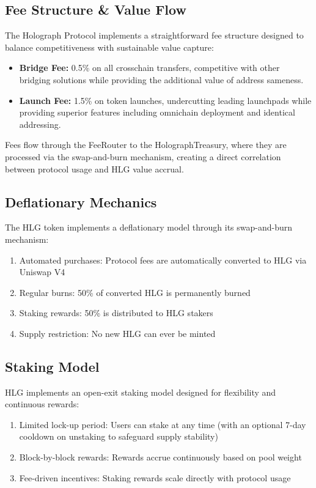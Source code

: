\documentclass[10pt,a4paper,twocolumn]{article}
\begin{document}
\subsection{Fee Structure \& Value Flow}
The Holograph Protocol implements a straightforward fee structure designed to balance competitiveness with sustainable value capture:
\begin{itemize}
  \item \textbf{Bridge Fee:} 0.5\% on all crosschain transfers, competitive with other bridging solutions while providing the additional value of address sameness.
  \item \textbf{Launch Fee:} 1.5\% on token launches, undercutting leading launchpads while providing superior features including omnichain deployment and identical addressing.
\end{itemize}
Fees flow through the FeeRouter to the HolographTreasury, where they are processed via the swap-and-burn mechanism, creating a direct correlation between protocol usage and HLG value accrual.

\subsection{Deflationary Mechanics}
The HLG token implements a deflationary model through its swap-and-burn mechanism:
\begin{enumerate}
  \item Automated purchases: Protocol fees are automatically converted to HLG via Uniswap V4
  \item Regular burns: 50\% of converted HLG is permanently burned
  \item Staking rewards: 50\% is distributed to HLG stakers
  \item Supply restriction: No new HLG can ever be minted
\end{enumerate}

\subsection{Staking Model}
HLG implements an open-exit staking model designed for flexibility and continuous rewards:
\begin{enumerate}
  \item Limited lock-up period: Users can stake at any time (with an optional 7-day cooldown on unstaking to safeguard supply stability)
  \item Block-by-block rewards: Rewards accrue continuously based on pool weight
  \item Fee-driven incentives: Staking rewards scale directly with protocol usage
\end{enumerate}
\end{document}
